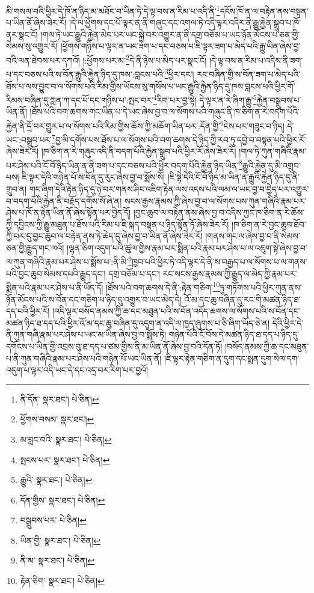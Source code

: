 མི་གསལ་བའི་ཕྱིར་དེ་ཁོ་ན་ཉིད་མ་མཐོང་བ་ཡིན་ཏེ་དེ་ལྟ་བས་ན་རིམ་པ་འདི་ནི་\footnote{ནི་དོན་  སྣར་ཐང་།  པེ་ཅིན། }དངོས་ཁོ་ན་ལ་བརྟེན་ནས་བསྟན་པ་ཡིན་ནོ་ཞེས་ཟེར་རོ། །དེ་ལ་ཕྱོགས་དང་པོ་ལྟར་ན་ནི་གཞུང་དང་འགལ་ཏེ་འདི་ལྟར་འདིར་ནི་རྒྱུ་རྐྱེན་སྒྲུབ་པ་ཁོ་ནར་སྣང་ངོ། །གལ་ཏེ་ཡང་རྒྱུའི་རྐྱེན་མེད་པར་ཡང་སྐྱེ་བར་འགྱུར་ན་ནི་དགྲ་བཅོམ་པ་ཡང་ཉོན་མོངས་པ་ཅན་གྱི་སེམས་སུ་འགྱུར་རོ། །ཕྱོགས་གཉིས་པ་ལྟར་ན་ཡང་ཟག་པ་དང་བཅས་པ་ཇི་ལྟར་ཟག་པ་མེད་པའི་རྒྱུ་ཡིན་ཞེས་བྱ་བའི་ལན་ཐེབས་པར་དཀའོ། །:ཕྱོགས་པར་མ་\footnote{ཕྱོགས་བསམ་  སྣར་ཐང་། }དེ་ནི་ཉེས་པ་མེད་པར་སྣང་ངོ། །དེ་ལྟ་བས་ན་རིམ་པ་འདིས་ནི་ཟག་པ་དང་བཅས་པའི་ས་བོན་རྒྱུའི་རྐྱེན་ཉིད་དུ་ཁས་:བླངས་པའི་\footnote{མ་བླང་བའི་  སྣར་ཐང་།  པེ་ཅིན། }ཕྱིར་དང་། རང་བཞིན་གྱི་ས་བོན་ཟག་པ་མེད་པའི་ཐོས་པ་ལས་བྱུང་བ་ལ་སོགས་པའི་རིམ་གྱིས་ཡོངས་སུ་གསོས་པ་ཡང་རྒྱུའི་རྐྱེན་ཉིད་དུ་ཁས་བླངས་པའི་ཕྱིར་གོ་རིམས་བཞིན་དུ་ཀླན་ཀ་དང་པོ་དང་གཉིས་པ་:སྤང་བར་\footnote{སྤངས་པར་  སྣར་ཐང་།  པེ་ཅིན། }རིག་པར་བྱ་སྟེ། དེ་ལྟར་ན་རེ་ཞིག་རྒྱུ་\footnote{རྒྱུའི་  སྣར་ཐང་།  པེ་ཅིན། }རྐྱེན་བསྒྲུབས་པ་ཡིན་ནོ། །ཐོས་པའི་བག་ཆགས་གང་ཡིན་པ་དེ་ཡང་ཞེས་བྱ་བ་ལ་སོགས་པའི་གཞུང་ནི་ཁ་ཅིག་ན་རེ་བདག་པོའི་རྐྱེན་ནི་དྲོ་བར་གྱུར་པ་ལ་སོགས་པའི་རིམ་གྱིས་ཆོས་ཀྱི་མཆོག་ཡིན་པར་:དོན་གྱི་\footnote{དོན་གྱིས་  སྣར་ཐང་།  པེ་ཅིན། }ངེས་པར་གཟུང་བ་ཉིད། དེ་ཡང་:བསྒྲུབ་པར་\footnote{བསྒྲུབས་པར་  པེ་ཅིན། }བྱ་མི་དགོས་པས་ཐོས་པ་ལ་སོགས་པའི་བག་ཆགས་དེ་ཉིད་ཀྱི་རབ་ཏུ་དབྱེ་བ་བསྟན་པའི་ཕྱིར་རོ་ཞེས་ཟེར་རོ། །ཁ་ཅིག་ན་རེ་གཞུང་འདི་ནི་བདག་པོའི་རྐྱེན་སྒྲུབ་པའི་ཕྱིར་རོ་ཞེས་ཟེར་རོ། །གལ་ཏེ་ཀུན་གཞིའི་རྣམ་པར་ཤེས་པའི་ངོ་བོ་ཉིད་ཡིན་ན་ནི་ཟག་པ་དང་བཅས་པའི་ཕྱིར་བདག་པོའི་རྐྱེན་ཉིད་ཡིན་\footnote{ཡིན་གྱི་  སྣར་ཐང་།  པེ་ཅིན། }རྒྱུའི་རྐྱེན་དུ་མི་འགྲུབ་པས། ཇི་ལྟར་དེའི་གཉེན་པོ་ས་བོན་དུ་རུང་ཞེས་བྱ་བ་སྨོས་སོ། །ཇི་སྟེ་དེའི་ངོ་བོ་ཉིད་མ་ཡིན་ན་རྒྱུའི་རྐྱེན་ཉིད་དུ་ནི་གྲུབ་ན། གང་ཞིག་དེའི་རྟེན་ཉིད་དུ་ཉེ་བར་གནས་ཤིང་འཇིག་རྟེན་ལས་འདས་པའི་ལམ་ལ་ཡང་བྱ་བ་བྱེད་པར་འགྱུར་བ་བདག་པོའི་རྐྱེན་ནི་བརྗོད་དགོས་སོ་ཞེ་ན། སངས་རྒྱས་རྣམས་ཀྱི་ཞེས་བྱ་བ་ལ་སོགས་པས་ཀུན་གཞིའི་རྣམ་པར་ཤེས་པ་ཁོ་ན་རྟེན་ཡིན་ནོ་ཞེས་སྟོན་པར་བྱེད་དོ། །བྱང་ཆུབ་ལ་བརྟེན་ནས་ཞེས་བྱ་བ་འདིས་ཀྱང་ཁ་ཅིག་ན་རེ་ཆོས་ཀྱི་དབྱིངས་ཀྱི་རྒྱུ་མཐུན་པ་ཐོས་པའི་རིམ་པ་ཇི་སྐད་བསྟན་པ་ཉིད་སྟོན་ཏོ་ཞེས་ཟེར་རོ། །ཁ་ཅིག་ན་རེ་བྱང་ཆུབ་ཐོབ་ཀྱི་བར་དུ་བྱང་ཆུབ་ལ་བརྟེན་ནས་ཏེ་ཆེད་དུ་ཞེས་བྱ་བ་ཡིན་ནོ་ཞེས་ཟེར་རོ། །གནས་གང་ལ་ཞེས་བྱ་བ་ནི་སེམས་ཅན་གྱི་རྒྱུད་གང་ལའོ། །ལྷན་ཅིག་འདུག་པའི་ཚུལ་གྱིས་རྣམ་པར་སྨིན་པའི་རྣམ་པར་ཤེས་པ་ལ་འཇུག་སྟེ་ཞེས་བྱ་བ་ལ་ཀུན་གཞིའི་རྣམ་པར་ཤེས་པ་སྨོས་པ་:ནི་མི་\footnote{ནི་མ་  སྣར་ཐང་།  པེ་ཅིན། }ཁྱབ་པའི་ཕྱིར་ཏེ་འདི་ལྟར་དེ་ནི་ས་བརྒྱད་པ་ལ་སོགས་པ་ལ་གནས་པའི་བྱང་ཆུབ་སེམས་དཔའི་རྒྱུད་དང་། དགྲ་བཅོམ་པ་དང་། རང་སངས་རྒྱས་རྣམས་ཀྱི་རྒྱུད་ལ་མེད་ཀྱི་རྣམ་པར་སྨིན་པའི་རྣམ་པར་ཤེས་པ་ནི་ཡོད་དོ། །ཐོས་པའི་བག་ཆགས་དེ་ནི་:རྟེན་གཅིག་\footnote{རྟེན་ཅིག་  སྣར་ཐང་།  པེ་ཅིན། }ཏུ་གཏོགས་པའི་ཕྱིར་ཀུན་ནས་ཉོན་མོངས་པའི་ས་བོན་དང་གཅིག་པ་ཉིད་དུ་འགྱུར་བ་ཡང་མེད་དེ། འོ་མ་དང་ཆུ་བཞིན་དུ་རང་གི་མཚན་ཉིད་ཐ་དད་པའི་ཕྱིར་རོ། །འདི་ལྟར་བསོད་ནམས་ཀྱི་ཆ་དང་མཐུན་པའི་ས་བོན་འདོད་ཆགས་ལ་སོགས་པའི་ས་བོན་དང་མཚན་ཉིད་ཐ་དད་པའི་ཕྱིར་འོ་མ་དང་ཆུ་བཞིན་དུ་འདུག་ན་འདི་ལ་ཁྱད་ཞུགས་པ་ཅི་ཞིག་ཡོད་ཅེ་ན། དེའི་ཕྱིར་དེ་ནི་ཀུན་གཞི་རྣམ་པར་ཤེས་པ་ཡང་མ་ཡིན་ཞེས་བྱ་བ་སྨོས་ཏེ། གཉེན་པོའི་ངོ་བོས་དེ་མཚན་ཉིད་ཐ་དད་པ་ཉིད་དུ་དགོངས་པ་ཡིན་གྱི་འབྲས་བུ་ཐ་དད་པ་ཙམ་གྱིས་ནི་མ་ཡིན་ནོ་ཞེས་བྱ་བའི་དོན་ཏོ། །བསོད་ནམས་ཀྱི་ཆ་དང་མཐུན་པ་ནི་ཀུན་གཞིའི་རྣམ་པར་ཤེས་པའི་གཉེན་པོ་ཡང་ཡིན་ནོ། །ཇི་ལྟར་རྟེན་གཅིག་ན་དུག་དང་སྨན་དུག་སེལ་དག་འདུག་པ་ལྟར་འདི་ཡང་དེ་དང་འདྲ་བར་རིག་པར་བྱའོ། 